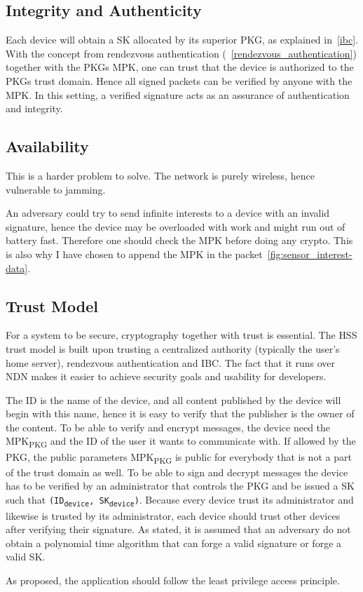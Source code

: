 \subsection{Integrity and Authenticity}
Each device will obtain a \gls{SK} allocated by its superior \gls{PKG}, as explained in~\autoref{ibc}.
With the concept from rendezvous authentication (~\autoref{rendezvous_authentication}) together with the \gls{PKG}s \gls{MPK}, one can trust that the device is authorized to the \gls{PKG}s trust domain. 
Hence all signed packets can be verified by anyone with the \gls{MPK}.
In this setting, a verified signature acts as an assurance of authentication and integrity. 


\subsection{Availability}
This is a harder problem to solve.
The network is purely wireless, hence vulnerable to jamming. 

An adversary could try to send infinite \gls{interest}s to a device with an invalid signature, hence the device may be overloaded with work and might run out of battery fast.
Therefore one should check the \gls{MPK} before doing any crypto.
This is also why I have chosen to append the MPK in the packet~\autoref{fig:sensor_interest-data}. 

\subsection{Trust Model}
For a system to be secure, cryptography together with trust is essential. 
The \gls{HSS} trust model is built upon trusting a centralized authority (typically the user's home server), rendezvous authentication and \gls{IBC}.
The fact that it runs over \gls{NDN} makes it easier to achieve security goals and usability for developers.

The \gls{ID} is the \gls{name} of the device, and all content published by the device will begin with this \gls{name}, hence it is easy to verify that the \gls{publisher} is the owner of the content.
To be able to verify and encrypt messages, the device need the MPK\textsubscript{PKG} and the ID of the user it wants to communicate with. 
If allowed by the PKG, the public parameters MPK\textsubscript{PKG} is public for everybody that is not a part of the trust domain as well. 
To be able to sign and decrypt messages the device has to be verified by an administrator that controls the \gls{PKG} and be issued a \gls{SK} such that \texttt{(ID\textsubscript{device}, SK\textsubscript{device})}. 
Because every device trust its administrator and likewise is trusted by its administrator, each device should trust other devices after verifying their signature.
As stated, it is assumed that an adversary do not obtain a polynomial time algorithm that can forge a valid signature or forge a valid \gls{SK}.

As proposed, the application should follow the least privilege access principle.

